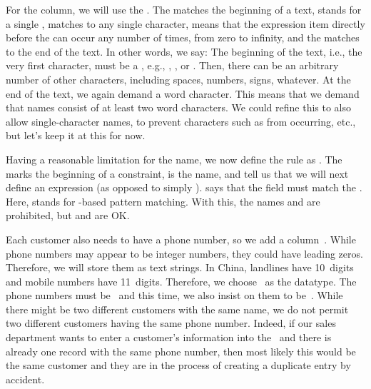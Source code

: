 For the  column, we will use the  .
The \textil{^} matches the beginning of a text, \textil{\\w} stands for a single ,  matches to any single character, \textil{*} means that the expression item directly before the \textil{*} can occur any number of times, from zero to infinity, and the \textil{\$} matches to the end of the text.
In other words, we say:
The beginning of the text, i.e., the very first character, must be a , e.g., , , or .
Then, there can be an arbitrary number of other characters, including spaces, numbers, signs, whatever.
At the end of the text, we again demand a word character.
This means that we demand that names consist of at least two word characters.
We could refine this to also allow single-character names, to prevent characters such as  from occurring, etc., but let's keep it at this for now.%
%
\begin{sloppypar}%
Having a reasonable limitation for the name, we now define the rule  as \sqlIdx{\$}\sqlIdx{\^}\sqlIdx{\textasciitilde}.
The  marks the beginning of a constraint,  is the name, and  tell us that we will next define an expression (as opposed to simply ).
\sqlIdx{\$}\sqlIdx{\^}\sqlIdx{\textasciitilde} says that the field  must match the  .
Here, \sqlil{\~}\sqlIdx{\textasciitilde} stands for -based pattern matching.
With this, the names  and  are prohibited, but  and  are OK.%
\end{sloppypar}%
%
Each customer also needs to have a phone number, so we add a column~.
While phone numbers may appear to be integer numbers, they could have leading zeros.
Therefore, we will store them as text strings.
In China, landlines have 10~digits and mobile numbers have 11~digits.
Therefore, we choose~ as the datatype.
The phone numbers must be~ and this time, we also insist on them to be~.
While there might be two different customers with the same name, we do not permit two different customers having the same phone number.
Indeed, if our sales department wants to enter a customer's information into the \db\ and there is already one record with the same phone number, then most likely this would be the same customer and they are in the process of creating a duplicate entry by accident.

